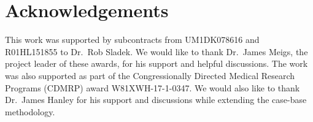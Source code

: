 \documentclass[AMA,STIX1COL,]{WileyNJD-v2}
\begin{document}
\hypertarget{acknowledgements}{%
\section*{Acknowledgements}\label{acknowledgements}}

This work was supported by subcontracts from UM1DK078616 and R01HL151855
to Dr.~Rob Sladek. We would like to thank Dr.~James Meigs, the project
leader of these awards, for his support and helpful discussions. The
work was also supported as part of the Congressionally Directed Medical
Research Programs (CDMRP) award W81XWH-17-1-0347. We would also like to
thank Dr.~James Hanley for his support and discussions while extending
the case-base methodology.


\end{document}
